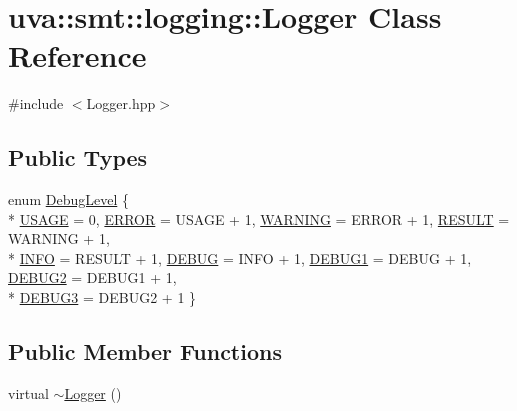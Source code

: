 \hypertarget{classuva_1_1smt_1_1logging_1_1_logger}{}\section{uva\+:\+:smt\+:\+:logging\+:\+:Logger Class Reference}
\label{classuva_1_1smt_1_1logging_1_1_logger}


{\ttfamily \#include $<$Logger.\+hpp$>$}

\subsection*{Public Types}
\begin{DoxyCompactItemize}
\item 
enum \hyperlink{classuva_1_1smt_1_1logging_1_1_logger_ad8a08f17c873112b1717d5fadbfe32d1}{Debug\+Level} \{ \\*
\hyperlink{classuva_1_1smt_1_1logging_1_1_logger_ad8a08f17c873112b1717d5fadbfe32d1ada6ecc276d8dd53e59ea137c7e4e5a8a}{U\+S\+A\+G\+E} = 0, 
\hyperlink{classuva_1_1smt_1_1logging_1_1_logger_ad8a08f17c873112b1717d5fadbfe32d1a55397e9f36c9c1d49a2b5c5f06a68205}{E\+R\+R\+O\+R} = U\+S\+A\+G\+E + 1, 
\hyperlink{classuva_1_1smt_1_1logging_1_1_logger_ad8a08f17c873112b1717d5fadbfe32d1a6ce36924e65e9fc2ead56b4aa0de74fb}{W\+A\+R\+N\+I\+N\+G} = E\+R\+R\+O\+R + 1, 
\hyperlink{classuva_1_1smt_1_1logging_1_1_logger_ad8a08f17c873112b1717d5fadbfe32d1aa7e4b44ca4abe5094a06c407d702c77e}{R\+E\+S\+U\+L\+T} = W\+A\+R\+N\+I\+N\+G + 1, 
\\*
\hyperlink{classuva_1_1smt_1_1logging_1_1_logger_ad8a08f17c873112b1717d5fadbfe32d1aa341c04184abe60847b19087e94a8cc1}{I\+N\+F\+O} = R\+E\+S\+U\+L\+T + 1, 
\hyperlink{classuva_1_1smt_1_1logging_1_1_logger_ad8a08f17c873112b1717d5fadbfe32d1a80c1a0a7d13c7c241805fe8a73720f70}{D\+E\+B\+U\+G} = I\+N\+F\+O + 1, 
\hyperlink{classuva_1_1smt_1_1logging_1_1_logger_ad8a08f17c873112b1717d5fadbfe32d1adb3f4a3acd55b0e10b40ce56054a15a8}{D\+E\+B\+U\+G1} = D\+E\+B\+U\+G + 1, 
\hyperlink{classuva_1_1smt_1_1logging_1_1_logger_ad8a08f17c873112b1717d5fadbfe32d1abd1059e3622450c09fa8c5e7187ea265}{D\+E\+B\+U\+G2} = D\+E\+B\+U\+G1 + 1, 
\\*
\hyperlink{classuva_1_1smt_1_1logging_1_1_logger_ad8a08f17c873112b1717d5fadbfe32d1a747d7f9e8625007771fde07c68088efa}{D\+E\+B\+U\+G3} = D\+E\+B\+U\+G2 + 1
 \}
\end{DoxyCompactItemize}
\subsection*{Public Member Functions}
\begin{DoxyCompactItemize}
\item 
virtual \hyperlink{classuva_1_1smt_1_1logging_1_1_logger_a3513d7db6ba5a43f59b56e3396712dbb}{$\sim$\+Logger} ()
\end{DoxyCompactItemize}
